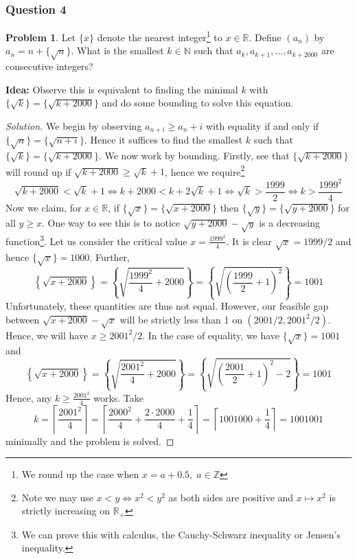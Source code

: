 \documentclass[11pt]{article}
\theoremstyle{definition}
\newtheorem*{problem}{Problem}
\begin{document}
\newpage 

\subsubsection{Question 4}

\begin{problem}
  Let $\{x\}$ denote the nearest integer\footnote{We round up the case when $x = a + 0.5, \; a \in \mathbb{Z}$} to 
  $x \in \mathbb{R}$. Define $(a_n)$ by $a_n = n + \{\sqrt{n}\}$. What is the smallest $k \in \mathbb{N}$ such that
  $a_k, a_{k+1}, \dots, a_{k + 2000}$ are consecutive integers?
\end{problem}

{\bf Idea:} Observe this is equivalent to finding the minimal $k$ with $\{\sqrt{k}\} = \{\sqrt{k + 2000}\}$ and do 
some bounding to solve this equation. 

\begin{proof}[Solution]
  We begin by observing $a_{n + i} \geq a_{n} + i$ with equality if and only if $\{\sqrt{n}\} = \{\sqrt{n + i}\}$. 
  Hence it suffices to find the smallest $k$ such that $\{\sqrt{k}\} = \{\sqrt{k + 2000}\}$. We now work by bounding. 
  Firstly, see that $\{\sqrt{k + 2000}\}$ will round up if $\sqrt{k + 2000} \geq \sqrt{k} + 1$, hence we require\footnote{
    Note we may use $x < y \Longleftrightarrow x^2 < y^2$ as both sides are positive and $x \mapsto x^2$ 
    is strictly increasing on $\mathbb{R}_+$
  }
  \[\sqrt{k + 2000} < \sqrt{k} + 1 \Longleftrightarrow k + 2000 < k + 2\sqrt{k} + 1 \Longleftrightarrow 
  \sqrt{k} > \frac{1999}{2} \Longleftrightarrow k > \frac{1999^2}{4}\]
  Now we claim, for $x \in \mathbb{R}$, if $\{\sqrt{x}\} = \{\sqrt{x + 2000}\}$ then $\{\sqrt{y}\} = \{\sqrt{y + 2000}\}$ 
  for all $y \geq x$. One way to see this is to notice $\sqrt{y + 2000} - \sqrt{y}$ is a decreasing function\footnote{
    We can prove this with calculus, the Cauchy-Schwarz inequality or Jensen's inequality.}. 
  Let us consider the critical value $x = \frac{1999^2}{4}$. It is clear $\sqrt{x} = 1999/2$ and hence 
  $\{\sqrt{x}\} = 1000$. Further,
  \[\left\{\sqrt{x + 2000}\right\} = \left\{\sqrt{\frac{1999^2}{4} + 2000}\right\} = 
  \left\{\sqrt{\left(\frac{1999}{2} + 1\right)^2}\right\} = 1001\]
  Unfortunately, these quantities are thus not equal. However, our feasible gap between $\sqrt{x+2000} - \sqrt{x}$ will 
  be strictly less than 1 on $(2001/2, 2001^2/2)$. Hence, we will have $x \geq 2001^2/2$. In the case of equality, we 
  have $\{\sqrt{x}\} = 1001$ and 
  \[\left\{\sqrt{x + 2000}\right\} = \left\{\sqrt{\frac{2001^2}{4} + 2000}\right\} 
  = \left\{\sqrt{\left(\frac{2001}{2} + 1\right)^2 - 2}\right\} = 1001\] 
  Hence, any $k \geq \frac{2001^2}{4}$ works. Take 
  \[k = \left\lceil \frac{2001^2}{4} \right\rceil = \left\lceil \frac{2000^2}{4} + 
  \frac{2 \cdot 2000}{4} + \frac{1}{4}\right\rceil = \left\lceil 1001000 + \frac{1}{4} \right\rceil = 1001001\]
  minimally and the problem is solved.
\end{proof}
\end{document}
